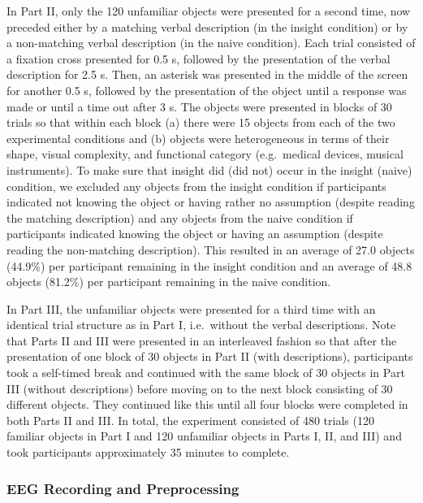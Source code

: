 \documentclass[
  english,
  man,11pt,floatsintext]{apa7}
\begin{document}
In Part II, only the 120 unfamiliar objects were presented for a second time, now preceded either by a matching verbal description (in the insight condition) or by a non-matching verbal description (in the naive condition). Each trial consisted of a fixation cross presented for 0.5 s, followed by the presentation of the verbal description for 2.5 s. Then, an asterisk was presented in the middle of the screen for another 0.5 s, followed by the presentation of the object until a response was made or until a time out after 3 s. The objects were presented in blocks of 30 trials so that within each block (a) there were 15 objects from each of the two experimental conditions and (b) objects were heterogeneous in terms of their shape, visual complexity, and functional category (e.g.~medical devices, musical instruments). To make sure that insight did (did not) occur in the insight (naive) condition, we excluded any objects from the insight condition if participants indicated not knowing the object or having rather no assumption (despite reading the matching description) and any objects from the naive condition if participants indicated knowing the object or having an assumption (despite reading the non-matching description). This resulted in an average of 27.0 objects (44.9\%) per participant remaining in the insight condition and an average of 48.8 objects (81.2\%) per participant remaining in the naive condition.

In Part III, the unfamiliar objects were presented for a third time with an identical trial structure as in Part I, i.e.~without the verbal descriptions. Note that Parts II and III were presented in an interleaved fashion so that after the presentation of one block of 30 objects in Part II (with descriptions), participants took a self-timed break and continued with the same block of 30 objects in Part III (without descriptions) before moving on to the next block consisting of 30 different objects. They continued like this until all four blocks were completed in both Parts II and III. In total, the experiment consisted of 480 trials (120 familiar objects in Part I and 120 unfamiliar objects in Parts I, II, and III) and took participants approximately 35 minutes to complete.

\hypertarget{eeg-recording-and-preprocessing}{%
\subsubsection{EEG Recording and Preprocessing}\label{eeg-recording-and-preprocessing}}
\end{document}
